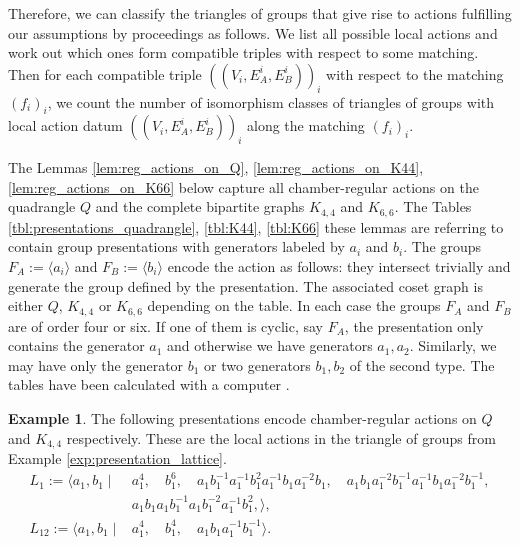 \documentclass[dvipsnames]{article}
\theoremstyle{definition}
\newtheorem{example}[theorem]{Example}
\theoremstyle{remark}
\begin{document}
    Therefore, we can classify the triangles of groups that give rise to actions fulfilling our assumptions by proceedings as follows.
    We list all possible local actions and work out which ones form compatible triples with respect to some matching. 
    Then for each compatible triple $((V_i, E^i_A, E^i_B))_i$ with respect to the matching $(f_i)_i$, we count the number of isomorphism classes of triangles of groups with local action datum $((V_i, E^i_A, E^i_B))_i$ along the matching $(f_i)_i$.
    
    The Lemmas \ref{lem:reg_actions_on_Q}, \ref{lem:reg_actions_on_K44}, \ref{lem:reg_actions_on_K66} below capture all chamber-regular actions on the quadrangle $Q$ and the complete bipartite graphs $K_{4,4}$ and $K_{6,6}$.
    The Tables \ref{tbl:presentations_quadrangle}, \ref{tbl:K44}, \ref{tbl:K66} these lemmas are referring to contain group presentations with generators labeled by $a_i$ and $b_i$. The groups $F_A := \langle a_i \rangle$ and $F_B := \langle b_i \rangle$ encode the action as follows: they intersect trivially and generate the group defined by the presentation. The associated coset graph is either $Q$, $K_{4,4}$ or $K_{6,6}$ depending on the table. In each case the groups $F_A$ and $F_B$ are of order four or six. If one of them is cyclic, say $F_A$, the presentation only contains the generator $a_1$ and otherwise we have generators $a_1, a_2$. Similarly, we may have only the generator $b_1$ or two generators $b_1, b_2$ of the second type.
    The tables have been calculated with a computer \cite{ChamberRegularCode}.

    \begin{example}
        The following presentations encode chamber-regular actions on $Q$ and $K_{4,4}$ respectively. These are the local actions in the triangle of groups from Example \ref{exp:presentation_lattice}.
        \begin{align*}
            L_1 :=
            \big \langle
            a_1,b_1 \; \big | \; &
            a_1^4,
            \quad b_1^6,
            \quad a_1 b_1^{-1} a_1^{-1} b_1^2 a_1^{-1} b_1 a_1^{-2} b_1,
            \quad a_1 b_1 a_1^{-2} b_1^{-1} a_1^{-1} b_1 a_1^{-2} b_1^{-1},\\
            & a_1 b_1 a_1 b_1^{-1} a_1 b_1^{-2} a_1^{-1} b_1^2,
            \big \rangle,\\[2mm]
            L_{12}:=
            \big \langle
            a_1,b_1 \; \big | \; &
            a_1^4, \quad
            b_1^4, \quad
            a_1 b_1 a_1^{-1} b_1^{-1}
            \big \rangle.
        \end{align*}
    \end{example}
    
\end{document}
